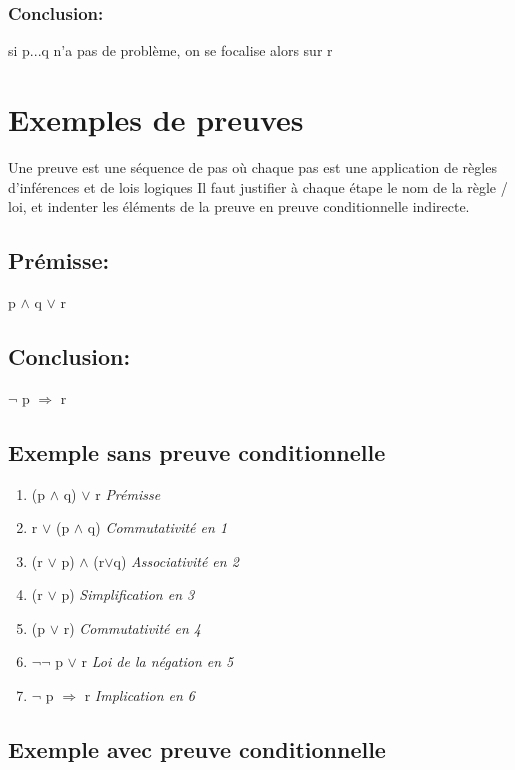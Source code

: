 \subsubsection{Conclusion:}

si p...q n'a pas de problème, on se focalise alors sur r
 

\section{Exemples de preuves}

Une preuve est une séquence de pas où chaque pas est une application de règles d'inférences et de lois logiques
Il faut justifier à chaque étape le nom de la règle / loi, et indenter les éléments de la preuve en preuve conditionnelle indirecte.

\subsection{Prémisse:} 

p $\land$ q $\lor$ r

\subsection{Conclusion:}

$\lnot$ p $\Rightarrow$ r

\subsection{Exemple sans preuve conditionnelle}

\begin{enumerate}
\item   (p $\land$ q) $\lor$ r  \textit{Prémisse}
\item   r $\lor$ (p $\land$ q)  \textit{Commutativité en 1}
\item   (r $\lor$ p) $\land$ (r$\lor$q) \textit{Associativité en 2}
\item   (r $\lor$ p) \textit{Simplification en 3}
\item   (p $\lor$ r) \textit{Commutativité en 4}
\item   $\lnot$$\lnot$ p $\lor$ r \textit{Loi de la négation en 5}
\item   $\lnot$ p $\Rightarrow$ r \textit{Implication en 6}
\end{enumerate}

\subsection{Exemple avec preuve conditionnelle}

